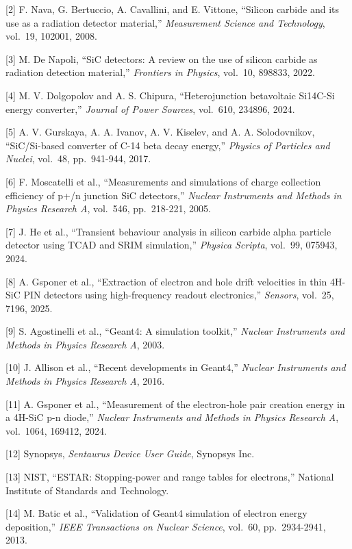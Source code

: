 \documentclass[
  10pt,
  a4paper,
]{ctexart}
\begin{document}
{[}2{]} F. Nava, G. Bertuccio, A. Cavallini, and E. Vittone, ``Silicon
carbide and its use as a radiation detector material,''
\emph{Measurement Science and Technology}, vol.~19, 102001, 2008.

{[}3{]} M. De Napoli, ``SiC detectors: A review on the use of silicon
carbide as radiation detection material,'' \emph{Frontiers in Physics},
vol.~10, 898833, 2022.

{[}4{]} M. V. Dolgopolov and A. S. Chipura, ``Heterojunction betavoltaic
Si14C-Si energy converter,'' \emph{Journal of Power Sources}, vol.~610,
234896, 2024.

{[}5{]} A. V. Gurskaya, A. A. Ivanov, A. V. Kiselev, and A. A.
Solodovnikov, ``SiC/Si-based converter of C-14 beta decay energy,''
\emph{Physics of Particles and Nuclei}, vol.~48, pp.~941-944, 2017.

{[}6{]} F. Moscatelli et al., ``Measurements and simulations of charge
collection efficiency of p+/n junction SiC detectors,'' \emph{Nuclear
Instruments and Methods in Physics Research A}, vol.~546, pp.~218-221,
2005.

{[}7{]} J. He et al., ``Transient behaviour analysis in silicon carbide
alpha particle detector using TCAD and SRIM simulation,'' \emph{Physica
Scripta}, vol.~99, 075943, 2024.

{[}8{]} A. Gsponer et al., ``Extraction of electron and hole drift
velocities in thin 4H-SiC PIN detectors using high-frequency readout
electronics,'' \emph{Sensors}, vol.~25, 7196, 2025.

{[}9{]} S. Agostinelli et al., ``Geant4: A simulation toolkit,''
\emph{Nuclear Instruments and Methods in Physics Research A}, 2003.

{[}10{]} J. Allison et al., ``Recent developments in Geant4,''
\emph{Nuclear Instruments and Methods in Physics Research A}, 2016.

{[}11{]} A. Gsponer et al., ``Measurement of the electron-hole pair
creation energy in a 4H-SiC p-n diode,'' \emph{Nuclear Instruments and
Methods in Physics Research A}, vol.~1064, 169412, 2024.

{[}12{]} Synopsys, \emph{Sentaurus Device User Guide}, Synopsys Inc.

{[}13{]} NIST, ``ESTAR: Stopping-power and range tables for electrons,''
National Institute of Standards and Technology.

{[}14{]} M. Batic et al., ``Validation of Geant4 simulation of electron
energy deposition,'' \emph{IEEE Transactions on Nuclear Science},
vol.~60, pp.~2934-2941, 2013.
\end{document}
